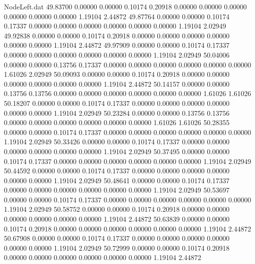 \begin{filecontents}{NodeLeft.dat}
  49.83700    0.00000    0.00000     0.10174    0.20918    0.00000    0.00000    0.00000    0.00000    0.00000    0.00000    1.19104    2.44872
  49.87764    0.00000    0.00000     0.10174    0.17337    0.00000    0.00000    0.00000    0.00000    0.00000    0.00000    1.19104    2.02949
  49.92838    0.00000    0.00000     0.10174    0.20918    0.00000    0.00000    0.00000    0.00000    0.00000    0.00000    1.19104    2.44872
  49.97909    0.00000    0.00000     0.10174    0.17337    0.00000    0.00000    0.00000    0.00000    0.00000    0.00000    1.19104    2.02949
  50.04006    0.00000    0.00000     0.13756    0.17337    0.00000    0.00000    0.00000    0.00000    0.00000    0.00000    1.61026    2.02949
  50.09093    0.00000    0.00000     0.10174    0.20918    0.00000    0.00000    0.00000    0.00000    0.00000    0.00000    1.19104    2.44872
  50.14157    0.00000    0.00000     0.13756    0.13756    0.00000    0.00000    0.00000    0.00000    0.00000    0.00000    1.61026    1.61026
  50.18207    0.00000    0.00000     0.10174    0.17337    0.00000    0.00000    0.00000    0.00000    0.00000    0.00000    1.19104    2.02949
  50.23284    0.00000    0.00000     0.13756    0.13756    0.00000    0.00000    0.00000    0.00000    0.00000    0.00000    1.61026    1.61026
  50.28355    0.00000    0.00000     0.10174    0.17337    0.00000    0.00000    0.00000    0.00000    0.00000    0.00000    1.19104    2.02949
  50.33426    0.00000    0.00000     0.10174    0.17337    0.00000    0.00000    0.00000    0.00000    0.00000    0.00000    1.19104    2.02949
  50.37495    0.00000    0.00000     0.10174    0.17337    0.00000    0.00000    0.00000    0.00000    0.00000    0.00000    1.19104    2.02949
  50.44592    0.00000    0.00000     0.10174    0.17337    0.00000    0.00000    0.00000    0.00000    0.00000    0.00000    1.19104    2.02949
  50.48641    0.00000    0.00000     0.10174    0.17337    0.00000    0.00000    0.00000    0.00000    0.00000    0.00000    1.19104    2.02949
  50.53697    0.00000    0.00000     0.10174    0.17337    0.00000    0.00000    0.00000    0.00000    0.00000    0.00000    1.19104    2.02949
  50.58752    0.00000    0.00000     0.10174    0.20918    0.00000    0.00000    0.00000    0.00000    0.00000    0.00000    1.19104    2.44872
  50.63839    0.00000    0.00000     0.10174    0.20918    0.00000    0.00000    0.00000    0.00000    0.00000    0.00000    1.19104    2.44872
  50.67908    0.00000    0.00000     0.10174    0.17337    0.00000    0.00000    0.00000    0.00000    0.00000    0.00000    1.19104    2.02949
  50.72999    0.00000    0.00000     0.10174    0.20918    0.00000    0.00000    0.00000    0.00000    0.00000    0.00000    1.19104    2.44872

\end{filecontents}
